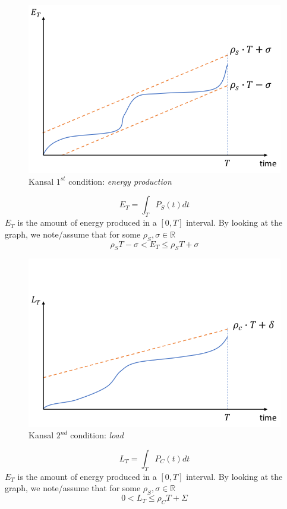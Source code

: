 \begin{paracol}{2}
   \begin{figure}[htbp]
      \centering
      \includegraphics{images/kansal_1.png}
      \caption{Kansal $1^{st}$ condition: \textit{energy production}}
      \label{fig:kansal_1}
   \end{figure}
   \switchcolumn
   \[E_T = \int_{T}P_S(t)dt\]
   $E_T$ is the amount of energy produced in a $[0,T]$ interval.
   By looking at the graph, we note/assume that for some $\rho_S,\sigma \in \mathbb{R}$
   \[\rho_S T - \sigma < E_T \leq \rho_S T + \sigma\] 

\end{paracol}

\begin{paracol}{2}
   \begin{figure}[htbp]
      \centering
      \includegraphics{images/kansal_2.png}
      \caption{Kansal $2^{nd}$ condition: \textit{load}}
      \label{fig:kansal_2}
   \end{figure}
   \switchcolumn
   \[L_T = \int_{T}P_C(t)dt\]
   $E_T$ is the amount of energy produced in a $[0,T]$ interval.
   By looking at the graph, we note/assume that for some $\rho_S,\sigma \in \mathbb{R}$
   \[0 < L_T \leq \rho_C T + \Sigma\] 

\end{paracol}

